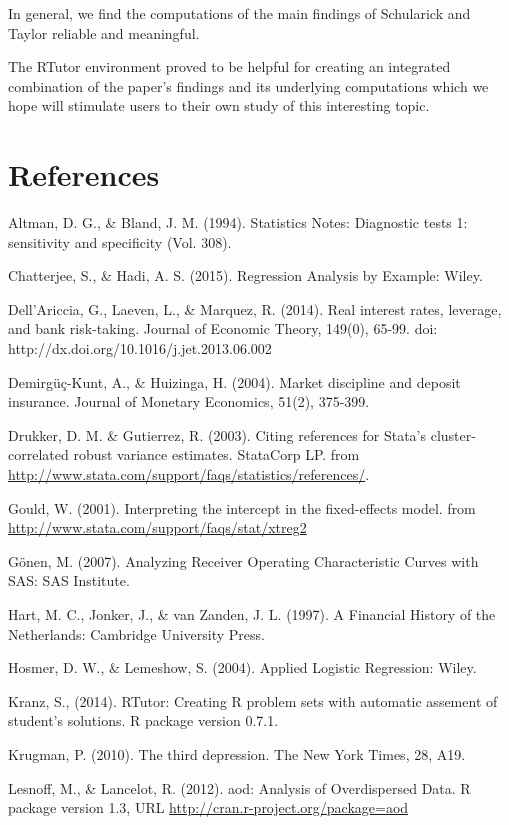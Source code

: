 \documentclass[a4paper,11pt,abstract=on]{scrartcl}
\begin{document}
In general, we find the computations of the main findings of Schularick and Taylor reliable and meaningful.

The RTutor environment proved to be helpful for creating an integrated combination of the paper’s findings and its underlying computations which we hope will stimulate users to their own study of this interesting topic.

\eject

\section{References}\label{exercise-sources}
\setlength{\parskip}{1em}
\linespread{1.0}
Altman, D. G., \& Bland, J. M. (1994). Statistics Notes: Diagnostic
tests 1: sensitivity and specificity (Vol. 308).

Chatterjee, S., \& Hadi, A. S. (2015). Regression Analysis by Example:
Wiley.

Dell'Ariccia, G., Laeven, L., \& Marquez, R. (2014). Real interest rates, leverage, and bank risk-taking. Journal of Economic Theory, 149(0), 65-99. doi: http://dx.doi.org/10.1016/j.jet.2013.06.002

Demirgüç-Kunt, A., \& Huizinga, H. (2004). Market discipline and deposit
insurance. Journal of Monetary Economics, 51(2), 375-399.

Drukker, D. M. \& Gutierrez, R. (2003). Citing references for Stata's
cluster-correlated robust variance estimates. StataCorp LP. from
\url{http://www.stata.com/support/faqs/statistics/references/}.

Gould, W. (2001). Interpreting the intercept in the fixed-effects model.
from \url{http://www.stata.com/support/faqs/stat/xtreg2}

Gönen, M. (2007). Analyzing Receiver Operating Characteristic Curves
with SAS: SAS Institute.

Hart, M. C., Jonker, J., \& van Zanden, J. L. (1997). A Financial
History of the Netherlands: Cambridge University Press.

Hosmer, D. W., \& Lemeshow, S. (2004). Applied Logistic Regression:
Wiley.

Kranz, S., (2014). RTutor: Creating R problem sets with automatic assement of student's solutions.
  R package version 0.7.1.


Krugman, P. (2010). The third depression. The New York Times, 28, A19.

Lesnoff, M., \& Lancelot, R. (2012). aod: Analysis of Overdispersed Data. R
package version 1.3, URL \url{http://cran.r-project.org/package=aod}
\end{document}
